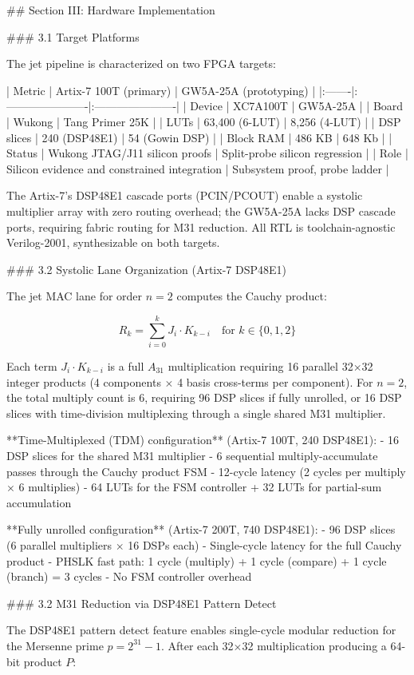 ## Section III: Hardware Implementation

### 3.1 Target Platforms

The jet pipeline is characterized on two FPGA targets:

| Metric | Artix-7 100T (primary) | GW5A-25A (prototyping) |
|:-------|:----------------------|:----------------------|
| Device | XC7A100T | GW5A-25A |
| Board | Wukong | Tang Primer 25K |
| LUTs | 63,400 (6-LUT) | 8,256 (4-LUT) |
| DSP slices | 240 (DSP48E1) | 54 (Gowin DSP) |
| Block RAM | 486 KB | 648 Kb |
| Status | Wukong JTAG/J11 silicon proofs | Split-probe silicon regression |
| Role | Silicon evidence and constrained integration | Subsystem proof, probe ladder |

The Artix-7's DSP48E1 cascade ports (PCIN/PCOUT) enable a systolic
multiplier array with zero routing overhead; the GW5A-25A lacks DSP
cascade ports, requiring fabric routing for M31 reduction. All RTL is
toolchain-agnostic Verilog-2001, synthesizable on both targets.

### 3.2 Systolic Lane Organization (Artix-7 DSP48E1)

The jet MAC lane for order $n=2$ computes the Cauchy product:

$$R_k = \sum_{i=0}^{k} J_i \cdot K_{k-i} \quad \text{for } k \in \{0, 1, 2\}$$

Each term $J_i \cdot K_{k-i}$ is a full $A_{31}$ multiplication requiring 16
parallel 32$\times$32 integer products (4 components $\times$ 4 basis cross-terms per
component). For $n=2$, the total multiply count is 6, requiring 96 DSP slices if
fully unrolled, or 16 DSP slices with time-division multiplexing through a single
shared M31 multiplier.

**Time-Multiplexed (TDM) configuration** (Artix-7 100T, 240 DSP48E1):
- 16 DSP slices for the shared M31 multiplier
- 6 sequential multiply-accumulate passes through the Cauchy product FSM
- 12-cycle latency (2 cycles per multiply $\times$ 6 multiplies)
- 64 LUTs for the FSM controller + 32 LUTs for partial-sum accumulation

**Fully unrolled configuration** (Artix-7 200T, 740 DSP48E1):
- 96 DSP slices (6 parallel multipliers $\times$ 16 DSPs each)
- Single-cycle latency for the full Cauchy product
- PHSLK fast path: 1 cycle (multiply) + 1 cycle (compare) + 1 cycle (branch) = 3 cycles
- No FSM controller overhead

### 3.2 M31 Reduction via DSP48E1 Pattern Detect

The DSP48E1 pattern detect feature enables single-cycle modular reduction for
the Mersenne prime $p = 2^{31} - 1$. After each 32$\times$32 multiplication producing
a 64-bit product $P$:

